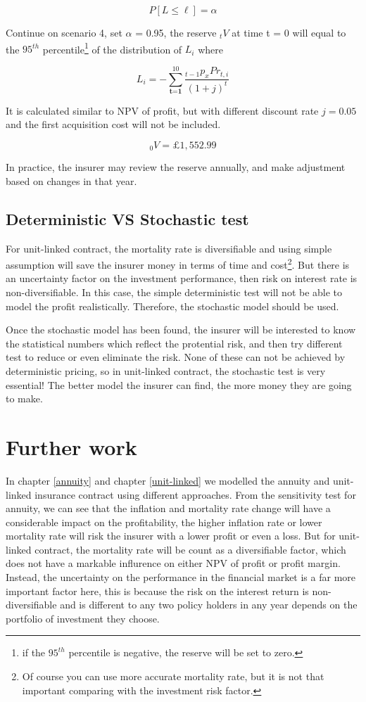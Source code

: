 \documentclass{report}
\begin{document}
\[
P[L\leq \ell] = \alpha
\]

Continue on scenario 4, set $\alpha$ = 0.95, the reserve $_tV$ at time t = 0 will equal to the $95^{th}$ percentile\footnote{if the $95^{th}$ percentile is negative, the reserve will be set to zero.} of the distribution of $L_i$ where

\[
L_i = - \sum_{\textbf{t=1}}^{10}\frac{_{t-1}p_x Pr_{t,i}}{(1+j)^t}
\]

It is calculated similar to NPV of profit, but with different discount rate $j = 0.05$ and the first acquisition cost will not be included.

\[
_0V = \pounds 1,552.99
\]


In practice, the insurer may review the reserve annually, and make adjustment based on changes in that year. 



\section{Deterministic VS Stochastic test}

For unit-linked contract, the mortality rate is diversifiable and using simple assumption will save the insurer money in terms of time and cost\footnote{Of course you can use more accurate mortality rate, but it is not that important comparing with the investment risk factor.}. But there is an uncertainty factor on the investment performance, then risk on interest rate is non-diversifiable. In this case, the simple deterministic test will not be able to model the profit realistically. Therefore, the stochastic model should be used. 

Once the stochastic model has been found, the insurer will be interested to know the statistical numbers which reflect the protential risk, and then try different test to reduce or even eliminate the risk. None of these can not be achieved by deterministic pricing, so in unit-linked contract, the stochastic test is very essential! The better model the insurer can find, the more money they are going to make.




\chapter{Further work}    

In chapter \ref{annuity} and chapter \ref{unit-linked} we modelled the annuity and unit-linked insurance contract using different approaches. From the sensitivity test for annuity, we can see that the inflation and mortality rate change will have a considerable impact on the profitability, the higher inflation rate or lower mortality rate will risk the insurer with a lower profit or even a loss. But for unit-linked contract, the mortality rate will be count as a diversifiable factor, which does not have a markable influrence on either NPV of profit or profit margin. Instead, the uncertainty on the performance in the financial market is a far more important factor here, this is because the risk on the interest return is non-diversifiable and is different to any two policy holders in any year depends on the portfolio of investment they choose.
\end{document}
